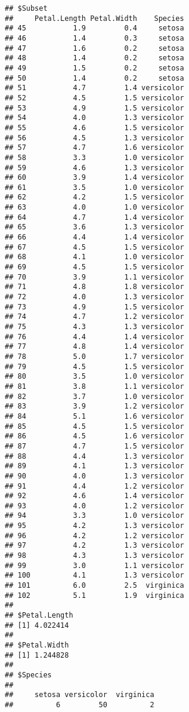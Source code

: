 \documentclass[
]{article}
\begin{document}
\begin{verbatim}
## $Subset
##     Petal.Length Petal.Width    Species
## 45           1.9         0.4     setosa
## 46           1.4         0.3     setosa
## 47           1.6         0.2     setosa
## 48           1.4         0.2     setosa
## 49           1.5         0.2     setosa
## 50           1.4         0.2     setosa
## 51           4.7         1.4 versicolor
## 52           4.5         1.5 versicolor
## 53           4.9         1.5 versicolor
## 54           4.0         1.3 versicolor
## 55           4.6         1.5 versicolor
## 56           4.5         1.3 versicolor
## 57           4.7         1.6 versicolor
## 58           3.3         1.0 versicolor
## 59           4.6         1.3 versicolor
## 60           3.9         1.4 versicolor
## 61           3.5         1.0 versicolor
## 62           4.2         1.5 versicolor
## 63           4.0         1.0 versicolor
## 64           4.7         1.4 versicolor
## 65           3.6         1.3 versicolor
## 66           4.4         1.4 versicolor
## 67           4.5         1.5 versicolor
## 68           4.1         1.0 versicolor
## 69           4.5         1.5 versicolor
## 70           3.9         1.1 versicolor
## 71           4.8         1.8 versicolor
## 72           4.0         1.3 versicolor
## 73           4.9         1.5 versicolor
## 74           4.7         1.2 versicolor
## 75           4.3         1.3 versicolor
## 76           4.4         1.4 versicolor
## 77           4.8         1.4 versicolor
## 78           5.0         1.7 versicolor
## 79           4.5         1.5 versicolor
## 80           3.5         1.0 versicolor
## 81           3.8         1.1 versicolor
## 82           3.7         1.0 versicolor
## 83           3.9         1.2 versicolor
## 84           5.1         1.6 versicolor
## 85           4.5         1.5 versicolor
## 86           4.5         1.6 versicolor
## 87           4.7         1.5 versicolor
## 88           4.4         1.3 versicolor
## 89           4.1         1.3 versicolor
## 90           4.0         1.3 versicolor
## 91           4.4         1.2 versicolor
## 92           4.6         1.4 versicolor
## 93           4.0         1.2 versicolor
## 94           3.3         1.0 versicolor
## 95           4.2         1.3 versicolor
## 96           4.2         1.2 versicolor
## 97           4.2         1.3 versicolor
## 98           4.3         1.3 versicolor
## 99           3.0         1.1 versicolor
## 100          4.1         1.3 versicolor
## 101          6.0         2.5  virginica
## 102          5.1         1.9  virginica
## 
## $Petal.Length
## [1] 4.022414
## 
## $Petal.Width
## [1] 1.244828
## 
## $Species
## 
##     setosa versicolor  virginica 
##          6         50          2
\end{verbatim}
\end{document}
